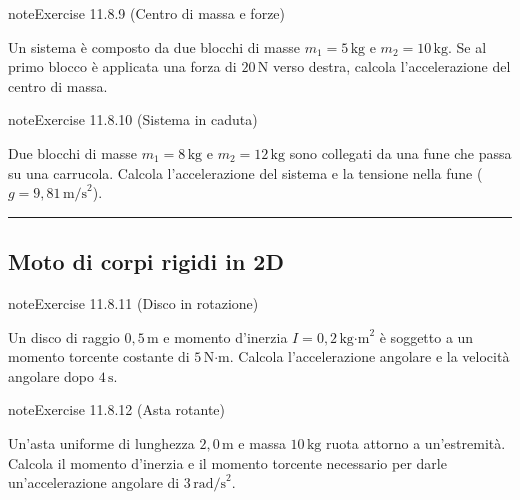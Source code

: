 \documentclass[letterpaper,10pt,italian]{jupyterBook}
\begin{document}
\begin{sphinxadmonition}{note}{Exercise 11.8.9 (Centro di massa e forze)}



\sphinxAtStartPar
Un sistema è composto da due blocchi di masse \(m_1 = 5 \, \text{kg}\) e \(m_2 = 10 \, \text{kg}\). Se al primo blocco è applicata una forza di \(20 \, \text{N}\) verso destra, calcola l’accelerazione del centro di massa.
\end{sphinxadmonition}
 \label{exercise:ch/mechanics/dynamics-problems-exercise-9}

\begin{sphinxadmonition}{note}{Exercise 11.8.10 (Sistema in caduta)}



\sphinxAtStartPar
Due blocchi di masse \(m_1 = 8 \, \text{kg}\) e \(m_2 = 12 \, \text{kg}\) sono collegati da una fune che passa su una carrucola. Calcola l’accelerazione del sistema e la tensione nella fune (\(g = 9,81 \, \text{m/s}^2\)).
\end{sphinxadmonition}


\bigskip\hrule\bigskip



\subsection{Moto di corpi rigidi in 2D}
\label{\detokenize{ch/mechanics/dynamics-problems:moto-di-corpi-rigidi-in-2d}} \label{exercise:ch/mechanics/dynamics-problems-exercise-10}

\begin{sphinxadmonition}{note}{Exercise 11.8.11 (Disco in rotazione)}



\sphinxAtStartPar
Un disco di raggio \(0,5 \, \text{m}\) e momento d’inerzia \(I = 0,2 \, \text{kg·m}^2\) è soggetto a un momento torcente costante di \(5 \, \text{N·m}\). Calcola l’accelerazione angolare e la velocità angolare dopo \(4 \, \text{s}\).
\end{sphinxadmonition}
 \label{exercise:ch/mechanics/dynamics-problems-exercise-11}

\begin{sphinxadmonition}{note}{Exercise 11.8.12 (Asta rotante)}



\sphinxAtStartPar
Un’asta uniforme di lunghezza \(2,0 \, \text{m}\) e massa \(10 \, \text{kg}\) ruota attorno a un’estremità. Calcola il momento d’inerzia e il momento torcente necessario per darle un’accelerazione angolare di \(3 \, \text{rad/s}^2\).
\end{sphinxadmonition}
 \label{exercise:ch/mechanics/dynamics-problems-exercise-12}
\end{document}
